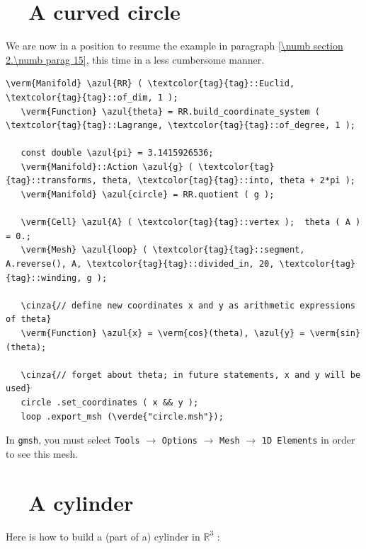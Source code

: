 \section{~~A curved circle}\label{\numb section 7.\numb parag 2}

We are now in a position to resume the example in paragraph \ref{\numb section 2.\numb parag 15},
this time in a less cumbersome manner.

\begin{Verbatim}[commandchars=\\\{\},formatcom=\small\tt,frame=single,
   label=parag-\ref{\numb section 7.\numb parag 2}.cpp,rulecolor=\color{coment},
   baselinestretch=0.94,framesep=2mm                                            ]
   \verm{Manifold} \azul{RR} ( \textcolor{tag}{tag}::Euclid, \textcolor{tag}{tag}::of_dim, 1 );
   \verm{Function} \azul{theta} = RR.build_coordinate_system ( \textcolor{tag}{tag}::Lagrange, \textcolor{tag}{tag}::of_degree, 1 );

   const double \azul{pi} = 3.1415926536;
   \verm{Manifold}::Action \azul{g} ( \textcolor{tag}{tag}::transforms, theta, \textcolor{tag}{tag}::into, theta + 2*pi );
   \verm{Manifold} \azul{circle} = RR.quotient ( g );

   \verm{Cell} \azul{A} ( \textcolor{tag}{tag}::vertex );  theta ( A ) = 0.;
   \verm{Mesh} \azul{loop} ( \textcolor{tag}{tag}::segment, A.reverse(), A, \textcolor{tag}{tag}::divided_in, 20, \textcolor{tag}{tag}::winding, g );

   \cinza{// define new coordinates x and y as arithmetic expressions of theta}
   \verm{Function} \azul{x} = \verm{cos}(theta), \azul{y} = \verm{sin}(theta);

   \cinza{// forget about theta; in future statements, x and y will be used}
   circle .set_coordinates ( x && y );
   loop .export_msh (\verde{"circle.msh"});
\end{Verbatim}

In {\tt gmsh}, you must select {\small\tt Tools} $\to$ {\small\tt Options} $\to$
{\small\tt Mesh} $\to$ {\small\tt 1D Elements} in order to see this mesh.


\section{~~A cylinder}\label{\numb section 7.\numb parag 3}

Here is how to build a (part of a) cylinder in $ \mathbb{R}^3 $ :

